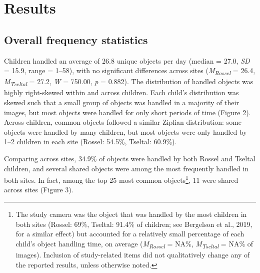 \documentclass[10pt, letterpaper]{article}
\begin{document}
\hypertarget{results}{%
\section{Results}\label{results}}

\hypertarget{overall-frequency-statistics}{%
\subsection{Overall frequency
statistics}\label{overall-frequency-statistics}}

Children handled an average of 26.8 unique objects per day (median =
27.0, \emph{SD} = 15.9, range = 1--58), with no significant differences
across sites (\emph{M}\textsubscript{\emph{Rossel}} = 26.4,
\emph{M}\textsubscript{\emph{Tseltal}} = 27.2, \emph{W} = 750.00,
\emph{p} = 0.882). The distribution of handled objects was highly
right-skewed within and across children. Each child's distribution was
skewed such that a small group of objects was handled in a majority of
their images, but most objects were handled for only short periods of
time (Figure 2). Across children, common objects followed a similar
Zipfian distribution: some objects were handled by many children, but
most objects were only handled by 1--2 children in each site (Rossel:
54.5\%, Tseltal: 60.9\%).

Comparing across sites, 34.9\% of objects were handled by both Rossel
and Tseltal children, and several shared objects were among the most
frequently handled in both sites. In fact, among the top 25 most common
objects\footnote{The study camera was the object that was handled by the
  most children in both sites (Rossel: 69\%, Tseltal: 91.4\% of
  children; see Bergelson et al., 2019, for a similar effect) but
  accounted for a relatively small percentage of each child's object
  handling time, on average (\emph{M}\textsubscript{\emph{Rossel}} =
  NA\%, \emph{M}\textsubscript{\emph{Tseltal}} = NA\% of images).
  Inclusion of study-related items did not qualitatively change any of
  the reported results, unless otherwise noted.}, 11 were shared across
sites (Figure 3).
\end{document}
